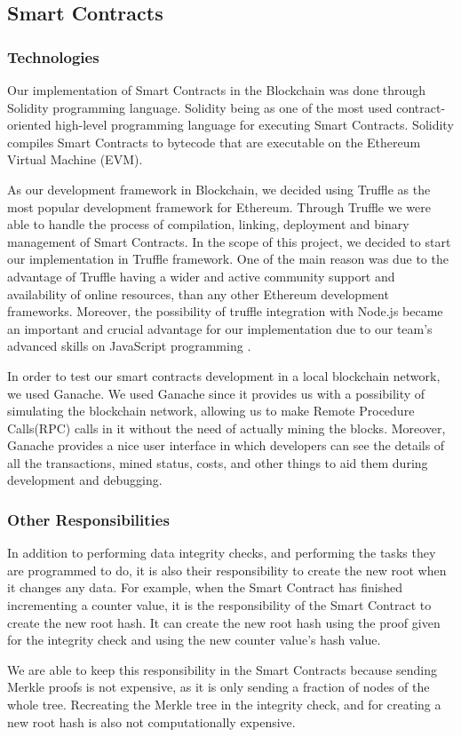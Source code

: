 \subsection{Smart Contracts}
\label{subsec:approach-smart-contracts}

\subsubsection*{Technologies}

Our implementation of Smart Contracts in the Blockchain was done through Solidity programming language. Solidity being as one of the most used contract-oriented high-level programming language for executing Smart Contracts. Solidity compiles Smart Contracts to bytecode that are executable on the Ethereum Virtual Machine (EVM). 

As our development framework in Blockchain, we decided using Truffle as the most popular development framework for Ethereum. Through Truffle we were able to handle the process of compilation, linking, deployment and binary management of Smart Contracts. In the scope of this project, we decided to start our implementation in Truffle framework. One of the main reason was due to the advantage of Truffle having a wider and active community support and availability of online resources, than any other Ethereum development frameworks. Moreover, the possibility of truffle integration with Node.js became an important and crucial advantage for our implementation due to our team’s advanced skills on JavaScript programming \cite{relatedWork29}.

In order to test our smart contracts development in a local blockchain network, we used Ganache. We used Ganache since it provides us with a possibility of simulating the blockchain network, allowing us to make Remote Procedure Calls(RPC) calls in it without the need of actually mining the blocks. Moreover, Ganache provides a nice user interface in which developers can see the details of all the transactions, mined status, costs, and other things to aid them during development and debugging. 

\subsubsection*{Other Responsibilities}

In addition to performing data integrity checks, and performing the tasks they are programmed to do, it is also their responsibility to create the new root when it changes any data. For example, when the Smart Contract has finished incrementing a counter value, it is the responsibility of the Smart Contract to create the new root hash. It can create the new root hash using the proof given for the integrity check and using the new counter value’s hash value. 

We are able to keep this responsibility in the Smart Contracts because sending Merkle proofs is not expensive, as it is only sending a fraction of nodes of the whole tree. Recreating the Merkle tree in the integrity check, and for creating a new root hash is also not computationally expensive.
